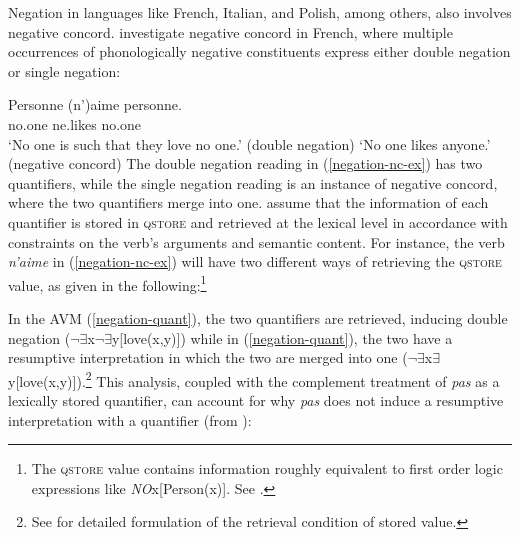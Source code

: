 \documentclass[output=paper
	        ,collection
	        ,collectionchapter
 	        ,biblatex
                ,babelshorthands
                ,newtxmath
                ,draftmode
                ,colorlinks, citecolor=brown
]{langscibook}
\begin{document}
{\begin{exe}
\begin{xlist}
Negation in languages like French, Italian, and Polish, among others, also involves negative concord.
 investigate  negative concord in French, where multiple occurrences
of phonologically negative constituents express either
double negation or single negation:

\ea \label{negation-nc-ex}
\gll Personne (n')aime personne.\\
     no.one ne.likes no.one\\
\glt `No one is such that they love no one.' \hfill (double negation)
\glt `No one likes anyone.' \hfill  (negative concord)
\z
%
%
The double negation reading in (\ref{negation-nc-ex}) has two quantifiers, while the single
negation reading is an instance of negative concord, where the two
quantifiers merge into one.  assume that the information of
each quantifier is stored in \textsc{qstore} and retrieved at the
lexical level in accordance with constraints on the verb's arguments and semantic
content. For instance, the verb \textit{n'aime} in (\ref{negation-nc-ex}) will have two different ways of retrieving the
\textsc{qstore} value, as given in the following:\footnote{The
\textsc{qstore} value contains information
roughly equivalent to first order logic expressions like \textit{NO}x[Person(x)]. See \citet{Swart:02}.}

\eal
\ex
{}
\ex
{}
\label{negation-quant}
\zl
%
%
\noindent
In the AVM (\ref{negation-quant}), the two quantifiers are retrieved, inducing double negation ($\neg\exists$x$\neg\exists$y[love(x,y)]) while in (\ref{negation-quant}), the two have a resumptive interpretation in which the two are merged into one ($\neg\exists$x$\exists$y[love(x,y)]).\footnote{See \citet{Swart:02} for detailed formulation of the retrieval condition of stored value.} This analysis, coupled with the complement treatment of \textit{pas} as a lexically stored quantifier, can account
for why \emph{pas} does not induce a resumptive interpretation with a quantifier (from \citealt{Swart:02}):



\end{xlist}
\end{exe}}
\end{document}

